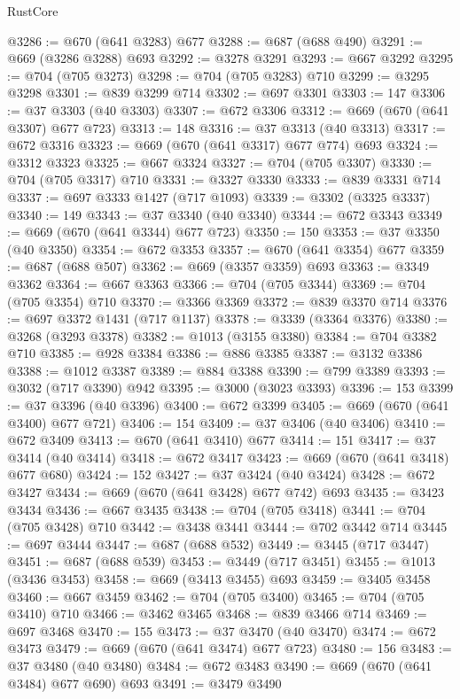 \begin{lexlean}{RustCore}
\begin{coremodule}
@3286 := @670 (@641 @3283) @677
@3288 := @687 (@688 @490)
@3291 := @669 (@3286 @3288) @693
@3292 := @3278 @3291
@3293 := @667 @3292
@3295 := @704 (@705 @3273)
@3298 := @704 (@705 @3283) @710
@3299 := @3295 @3298
@3301 := @839 @3299 @714
@3302 := @697 @3301
@3303 := 147
@3306 := @37 @3303 (@40 @3303)
@3307 := @672 @3306
@3312 := @669 (@670 (@641 @3307) @677 @723)
@3313 := 148
@3316 := @37 @3313 (@40 @3313)
@3317 := @672 @3316
@3323 := @669 (@670 (@641 @3317) @677 @774) @693
@3324 := @3312 @3323
@3325 := @667 @3324
@3327 := @704 (@705 @3307)
@3330 := @704 (@705 @3317) @710
@3331 := @3327 @3330
@3333 := @839 @3331 @714
@3337 := @697 @3333 @1427 (@717 @1093)
@3339 := @3302 (@3325 @3337)
@3340 := 149
@3343 := @37 @3340 (@40 @3340)
@3344 := @672 @3343
@3349 := @669 (@670 (@641 @3344) @677 @723)
@3350 := 150
@3353 := @37 @3350 (@40 @3350)
@3354 := @672 @3353
@3357 := @670 (@641 @3354) @677
@3359 := @687 (@688 @507)
@3362 := @669 (@3357 @3359) @693
@3363 := @3349 @3362
@3364 := @667 @3363
@3366 := @704 (@705 @3344)
@3369 := @704 (@705 @3354) @710
@3370 := @3366 @3369
@3372 := @839 @3370 @714
@3376 := @697 @3372 @1431 (@717 @1137)
@3378 := @3339 (@3364 @3376)
@3380 := @3268 (@3293 @3378)
@3382 := @1013 (@3155 @3380)
@3384 := @704 @3382 @710
@3385 := @928 @3384
@3386 := @886 @3385
@3387 := @3132 @3386
@3388 := @1012 @3387
@3389 := @884 @3388
@3390 := @799 @3389
@3393 := @3032 (@717 @3390) @942
@3395 := @3000 (@3023 @3393)
@3396 := 153
@3399 := @37 @3396 (@40 @3396)
@3400 := @672 @3399
@3405 := @669 (@670 (@641 @3400) @677 @721)
@3406 := 154
@3409 := @37 @3406 (@40 @3406)
@3410 := @672 @3409
@3413 := @670 (@641 @3410) @677
@3414 := 151
@3417 := @37 @3414 (@40 @3414)
@3418 := @672 @3417
@3423 := @669 (@670 (@641 @3418) @677 @680)
@3424 := 152
@3427 := @37 @3424 (@40 @3424)
@3428 := @672 @3427
@3434 := @669 (@670 (@641 @3428) @677 @742) @693
@3435 := @3423 @3434
@3436 := @667 @3435
@3438 := @704 (@705 @3418)
@3441 := @704 (@705 @3428) @710
@3442 := @3438 @3441
@3444 := @702 @3442 @714
@3445 := @697 @3444
@3447 := @687 (@688 @532)
@3449 := @3445 (@717 @3447)
@3451 := @687 (@688 @539)
@3453 := @3449 (@717 @3451)
@3455 := @1013 (@3436 @3453)
@3458 := @669 (@3413 @3455) @693
@3459 := @3405 @3458
@3460 := @667 @3459
@3462 := @704 (@705 @3400)
@3465 := @704 (@705 @3410) @710
@3466 := @3462 @3465
@3468 := @839 @3466 @714
@3469 := @697 @3468
@3470 := 155
@3473 := @37 @3470 (@40 @3470)
@3474 := @672 @3473
@3479 := @669 (@670 (@641 @3474) @677 @723)
@3480 := 156
@3483 := @37 @3480 (@40 @3480)
@3484 := @672 @3483
@3490 := @669 (@670 (@641 @3484) @677 @690) @693
@3491 := @3479 @3490

\end{coremodule}
\end{lexlean}
